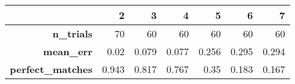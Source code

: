 \begin{tabular}{rrrrrrr}
\toprule
{} &      2 &      3 &      4 &      5 &      6 &      7 \\
\midrule
\textbf{n\_trials       } &     70 &     60 &     60 &     60 &     60 &     60 \\
\textbf{mean\_err       } &   0.02 &  0.079 &  0.077 &  0.256 &  0.295 &  0.294 \\
\textbf{perfect\_matches} &  0.943 &  0.817 &  0.767 &   0.35 &  0.183 &  0.167 \\
\bottomrule
\end{tabular}
